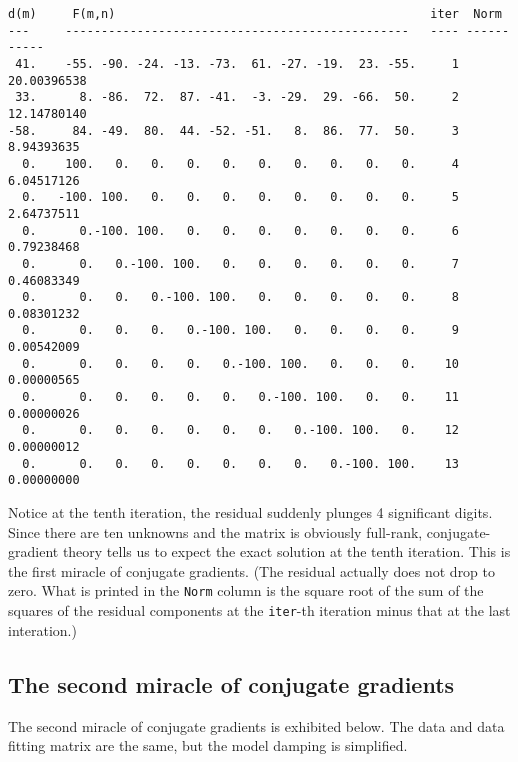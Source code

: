 {\samepage
\par\noindent
\footnotesize
\begin{verbatim}
d(m)     F(m,n)                                            iter  Norm
---     ------------------------------------------------   ---- -----------
 41.    -55. -90. -24. -13. -73.  61. -27. -19.  23. -55.     1 20.00396538
 33.      8. -86.  72.  87. -41.  -3. -29.  29. -66.  50.     2 12.14780140
-58.     84. -49.  80.  44. -52. -51.   8.  86.  77.  50.     3  8.94393635
  0.    100.   0.   0.   0.   0.   0.   0.   0.   0.   0.     4  6.04517126
  0.   -100. 100.   0.   0.   0.   0.   0.   0.   0.   0.     5  2.64737511
  0.      0.-100. 100.   0.   0.   0.   0.   0.   0.   0.     6  0.79238468
  0.      0.   0.-100. 100.   0.   0.   0.   0.   0.   0.     7  0.46083349
  0.      0.   0.   0.-100. 100.   0.   0.   0.   0.   0.     8  0.08301232
  0.      0.   0.   0.   0.-100. 100.   0.   0.   0.   0.     9  0.00542009
  0.      0.   0.   0.   0.   0.-100. 100.   0.   0.   0.    10  0.00000565
  0.      0.   0.   0.   0.   0.   0.-100. 100.   0.   0.    11  0.00000026
  0.      0.   0.   0.   0.   0.   0.   0.-100. 100.   0.    12  0.00000012
  0.      0.   0.   0.   0.   0.   0.   0.   0.-100. 100.    13  0.00000000
\end{verbatim}
}
\normalsize

\par
Notice at the tenth iteration,
the residual suddenly plunges 4 significant digits.
Since there are ten unknowns and the matrix is obviously full-rank,
conjugate-gradient theory tells us to expect
the exact solution at the tenth iteration.
This is the first miracle of conjugate gradients.
(The residual actually does not drop to zero.
What is printed in the \texttt{Norm} column
is the square root of the sum of the squares
of the residual components at the \texttt{iter}-th
iteration minus that at the last interation.)


\subsection{The second miracle of conjugate gradients}

The second miracle of conjugate gradients is exhibited below.
The data and data fitting matrix are the same,
but the model damping is simplified.

